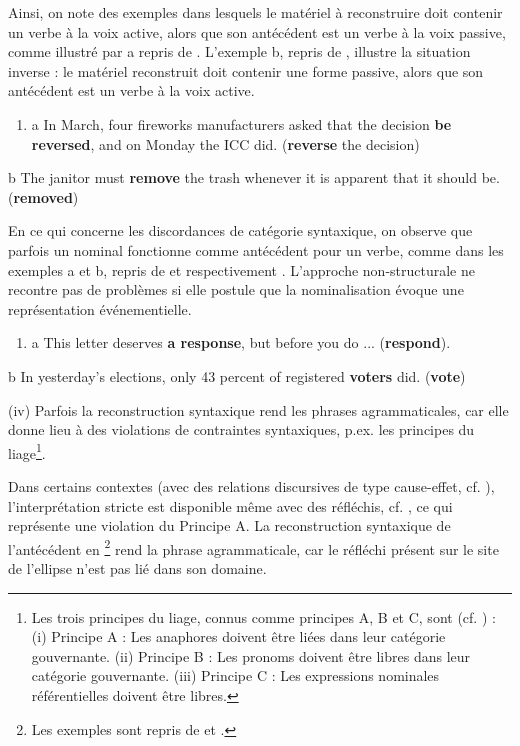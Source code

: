 Ainsi, on note des exemples dans lesquels le matériel à reconstruire doit contenir un verbe à la voix active, alors que son antécédent est un verbe à la voix passive, comme illustré par a repris de \citet{Dalrymple2005}. L'exemple b, repris de \citet{Merchant2008}, illustre la situation inverse : le matériel reconstruit doit contenir une forme passive, alors que son antécédent est un verbe à la voix active. 


\begin{enumerate}
\item \label{bkm:Ref305960735}a  In March, four fireworks manufacturers asked that the decision \textbf{be reversed}, and on Monday the ICC did. (\textbf{reverse} the decision) 


\end{enumerate}
  b  The janitor must \textbf{remove} the trash whenever it is apparent that it should be. (\textbf{removed}) 

En ce qui concerne les discordances de catégorie syntaxique, on observe que parfois un nominal fonctionne comme antécédent pour un verbe, comme dans les exemples a et b, repris de \citet{Dalrymple2005} et respectivement \citet{Kennedy2003}. L'approche non-structurale ne recontre pas de problèmes si elle postule que la nominalisation évoque une représentation événementielle.


\begin{enumerate}
\item \label{bkm:Ref305961105}a  This letter deserves \textbf{a response}, but before you do ... (\textbf{respond}). 


\end{enumerate}
  b   In yesterday's elections, only 43 percent of registered \textbf{voters} did. (\textbf{vote})

(iv) Parfois la reconstruction syntaxique rend les phrases agrammaticales, car elle donne lieu à des violations de contraintes syntaxiques, p.ex. les principes du liage\footnote{Les trois principes du liage, connus comme principes A, B et C, sont (cf. \citet{Lobeck1995}) :
(i)  Principe A : Les anaphores doivent être liées dans leur catégorie gouvernante.
(ii)  Principe B : Les pronoms doivent être libres dans leur catégorie gouvernante.
(iii)  Principe C : Les expressions nominales référentielles doivent être libres.}.

Dans certains contextes (avec des relations discursives de type cause-effet, cf. \citet{Kehler2000}), l'interprétation stricte est disponible même avec des réfléchis, cf. \citet{Hardt1993}, ce qui représente une violation du Principe A. La reconstruction syntaxique de l'antécédent en \footnote{Les exemples sont repris de \citet{Kehler2000} et \citet{Dalrymple2005}.} rend la phrase agrammaticale, car le réfléchi présent sur le site de l'ellipse n'est pas lié dans son domaine. 


